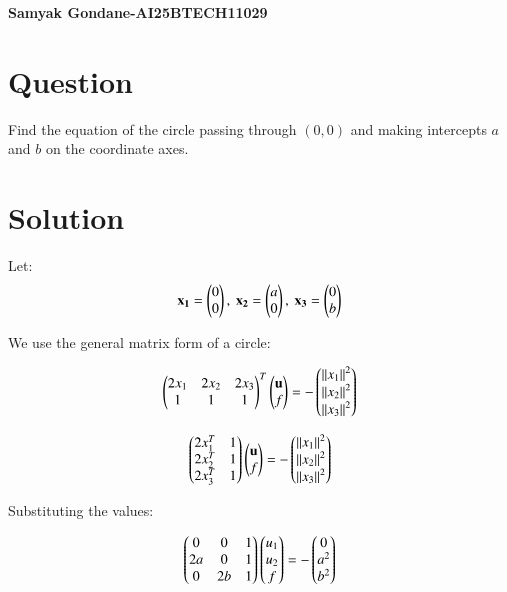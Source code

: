 \documentclass{article}
\begin{document}
\begin{center}
\large
    \textbf{Samyak Gondane-AI25BTECH11029}
\end{center}
\date{}

\section*{Question}
Find the equation of the circle passing through $(0, 0)$ and making intercepts $a$ and $b$ on the coordinate axes.


\section*{Solution}

Let:
\begin{align}
\mathbf{x_1} = \begin{pmatrix}0 \\ 0\end{pmatrix},\ \mathbf{x_2} = \begin{pmatrix}a \\ 0\end{pmatrix},\ \mathbf{x_3} = \begin{pmatrix}0 \\ b\end{pmatrix}
\end{align}

We use the general matrix form of a circle:


\begin{align}
\begin{pmatrix}2x_1 & 2x_2 & 2x_3\\
1 & 1 & 1\end{pmatrix}^T \begin{pmatrix}\mathbf{u} \\ f\end{pmatrix} = - \begin{pmatrix}\left\lVert x_1\right\rVert^2 \\ \left\lVert x_2\right\rVert^2 \\ \left\lVert x_3\right\rVert^2\end{pmatrix}
\end{align}


\begin{align}
\begin{pmatrix}
2x_1^T & 1 \\
2x_2^T & 1 \\
2x_3^T & 1
\end{pmatrix}
\begin{pmatrix}
\mathbf{u} \\
f
\end{pmatrix}
=
- \begin{pmatrix}
\left\lVert x_1\right\rVert^2 \\
\left\lVert x_2\right\rVert^2 \\
\left\lVert x_3\right\rVert^2
\end{pmatrix}
\end{align}


Substituting the values:

\begin{align}
\begin{pmatrix}
0 & 0 & 1 \\
2a & 0 & 1 \\
0 & 2b & 1
\end{pmatrix}
\begin{pmatrix}
u_1 \\
u_2 \\
f
\end{pmatrix}
=
- \begin{pmatrix}
0 \\
a^2 \\
b^2
\end{pmatrix}
\end{align}
\end{document}
